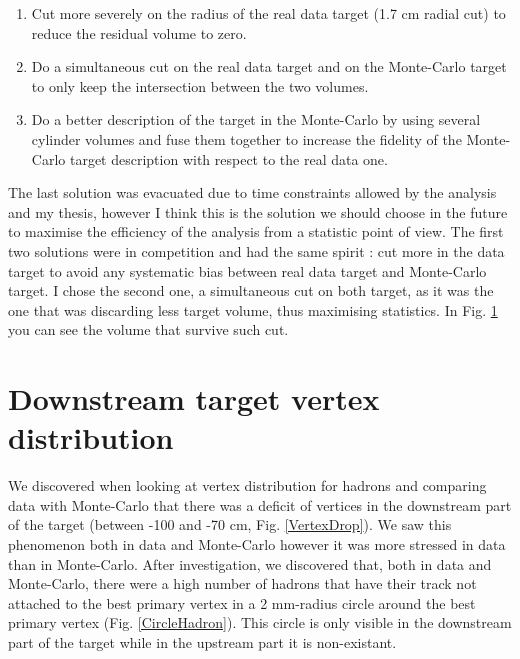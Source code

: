\begin{enumerate}
  \item Cut more severely on the radius of the real data target (1.7 cm radial cut) to reduce the  residual volume to zero.
  \item Do a simultaneous cut on the real data target and on the Monte-Carlo target to only keep the intersection between the two volumes.
  \item Do a better description of the target in the Monte-Carlo by using several cylinder volumes and fuse them together to increase the fidelity of the Monte-Carlo target description with respect to the real data one.
\end{enumerate}

The last solution was evacuated due to time constraints allowed by the analysis and my thesis, however I think this is the solution we should choose in the future to maximise the efficiency of the analysis from a statistic point of view.
The first two solutions were in competition and had the same spirit : cut more in the data target to avoid any systematic bias between real data target and Monte-Carlo target. I chose the second one, a simultaneous cut on both target, as it was the one that was discarding less target volume, thus maximising statistics. In Fig. \ref{} you can see the volume that survive such cut.


\section{Downstream target vertex distribution}

We discovered when looking at vertex distribution for hadrons and comparing data with Monte-Carlo that there was a deficit of vertices in the downstream part of the target (between -100 and -70 cm, Fig. \ref{VertexDrop}). We saw this phenomenon both in data and Monte-Carlo however it was more stressed in data than in Monte-Carlo. After investigation, we discovered that, both in data and Monte-Carlo, there were a high number of hadrons that have their track not attached to the best primary vertex in a 2 mm-radius circle around the best primary vertex (Fig. \ref{CircleHadron}). This circle is only visible in the downstream part of the target while in the upstream part it is non-existant.

